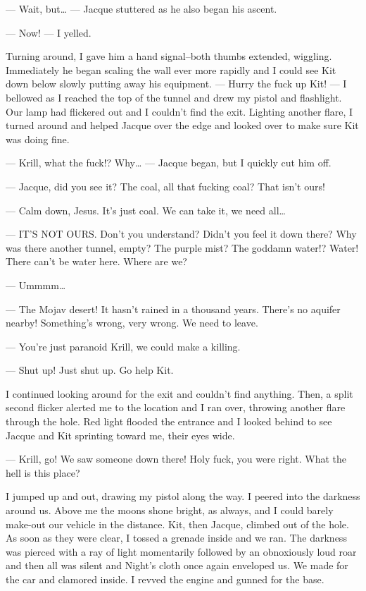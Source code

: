--- Wait, but\ldots{} --- Jacque stuttered as he also began his ascent.

--- Now! --- I yelled.

Turning around, I gave him a hand signal--both thumbs extended, wiggling. Immediately he began scaling the wall ever more rapidly and I could see Kit down below slowly putting away his equipment. --- Hurry the fuck up Kit! --- I bellowed as I reached the top of the tunnel and drew my pistol and flashlight. Our lamp had flickered out and I couldn't find the exit. Lighting another flare, I turned around and helped Jacque over the edge and looked over to make sure Kit was doing fine.

--- Krill, what the fuck!? Why\ldots{} --- Jacque began, but I quickly cut him off.

--- Jacque, did you see it? The coal, all that fucking coal? That isn't ours!

--- Calm down, Jesus. It's just coal. We can take it, we need all\ldots{}

--- IT'S NOT OURS. Don't you understand? Didn't you feel it down there? Why was there another tunnel, empty? The purple mist? The goddamn water!? Water! There can't be water here. Where are we? 

--- Ummmm\ldots{}

--- The Mojav desert! It hasn't rained in a thousand years. There's no aquifer nearby! Something's wrong, very wrong. We need to leave.

--- You're just paranoid Krill, we could make a killing.

--- Shut up! Just shut up. Go help Kit.

I continued looking around for the exit and couldn't find anything. Then, a split second flicker alerted me to the location and I ran over, throwing another flare through the hole. Red light flooded the entrance and I looked behind to see Jacque and Kit sprinting toward me, their eyes wide.

--- Krill, go! We saw someone down there! Holy fuck, you were right. What the hell is this place?

I jumped up and out, drawing my pistol along the way. I peered into the darkness around us. Above me the moons shone bright, as always, and I could barely make-out our vehicle in the distance. Kit, then Jacque, climbed out of the hole. As soon as they were clear, I tossed a grenade inside and we ran. The darkness was pierced with a ray of light momentarily followed by an obnoxiously loud roar and then all was silent and Night's cloth once again enveloped us. We made for the car and clamored inside. I revved the engine and gunned for the base.

